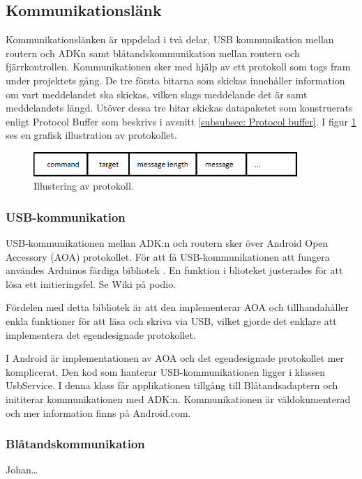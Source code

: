 \subsection{Kommunikationslänk}
Kommunikationslänken är uppdelad i två delar, USB kommunikation mellan routern
och ADKn samt blåtandskommunikation mellan routern och fjärrkontrollen.
Kommunikationen sker med hjälp av ett protokoll som  togs fram under projektets
gång. De tre första bitarna som skickas innehåller information om vart
meddelandet ska skickas, vilken slags meddelande det är samt meddelandets längd.
Utöver dessa tre bitar skickas datapaketet som konstruerats enligt Protocol
Buffer som beskrivs i avsnitt \ref{subsubsec: Protocol buffer}. I figur
\ref{fig:protocol} ses en grafisk illustration av protokollet.

\begin{figure}[htbp!]
\centering
\includegraphics[width=10cm]{../../includes/figures/protocol.png}
\caption{Illustering av protokoll.}
\label{fig:protocol}
\end{figure}


\subsubsection{USB-kommunikation}
USB-kommunikationen mellan ADK:n och routern sker över Android Open Accessory
(AOA) protokollet. För att få USB-kommunikationen att fungera användes Arduinos
färdiga bibliotek \cite{USBHost}. En funktion i blioteket justerades för att
lösa ett initieringsfel. Se Wiki på podio.
 
Fördelen med detta bibliotek är att den implementerar AOA och tillhandahåller enkla funktioner för att läsa och skriva via USB, vilket 
gjorde det enklare att implementera det egendesignade protokollet.

I Android är implementationen av AOA och det egendesignade protokollet mer komplicerat. Den kod som hanterar USB-kommunikationen ligger 
i klassen UsbService. I denna klass får applikationen tillgång till Blåtandsadaptern och inititerar kommunikationen med ADK:n. 
Kommunikationen är väldokumenterad och mer information finns på Android.com.
 
\subsubsection{Blåtandskommunikation}
Johan\ldots

